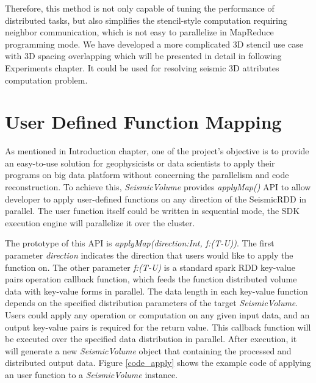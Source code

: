 Therefore, this method is not only capable of tuning the performance of distributed tasks, but also simplifies the stencil-style computation requiring neighbor communication, which is not easy to parallelize in MapReduce programming mode. We have developed a more complicated 3D stencil use case with 3D spacing overlapping which will be presented in detail in following Experiments chapter. It could be used for resolving seismic 3D attributes computation problem.


\section{User Defined Function Mapping}

As mentioned in Introduction chapter, one of the project's objective is to provide an easy-to-use solution for geophysicists or data scientists to apply their programs on big data platform without concerning the parallelism and code reconstruction. To achieve this, \emph{SeismicVolume} provides \emph{applyMap()} API to allow developer to apply user-defined functions on any direction of the SeismicRDD in parallel. The user function itself could be written in sequential mode, the SDK execution engine will parallelize it over the cluster.

The prototype of this API is \emph{applyMap(direction:Int, f:(T-U))}. The first parameter \emph{direction} indicates the direction that users would like to apply the function on. The other parameter \emph{f:(T-U)} is a standard spark RDD key-value pairs operation callback function, which feeds the function distributed volume data with key-value forms in parallel. The data length in each key-value function depends on the specified distribution parameters of the target \emph{SeismicVolume}.  Users could apply any operation or computation on any given input data, and an output key-value pairs is required for the return value. This callback function will be executed over the specified data distribution in parallel. After execution, it will generate a new \emph{SeismicVolume} object that containing the processed and distributed output data.  Figure \ref{code_apply} shows the example code of applying an user function to a \emph{SeismicVolume} instance.

